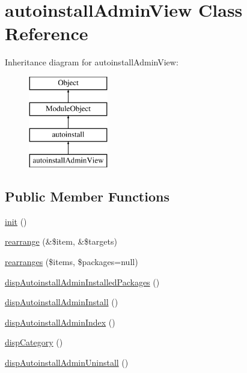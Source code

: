 \hypertarget{classautoinstallAdminView}{}\section{autoinstall\+Admin\+View Class Reference}
\label{classautoinstallAdminView}
Inheritance diagram for autoinstall\+Admin\+View\+:\begin{figure}[H]
\begin{center}
\leavevmode
\includegraphics[height=4.000000cm]{classautoinstallAdminView}
\end{center}
\end{figure}
\subsection*{Public Member Functions}
\begin{DoxyCompactItemize}
\item 
\hyperlink{classautoinstallAdminView_a206401d0dc48b6d0e60f1520ba972526}{init} ()
\item 
\hyperlink{classautoinstallAdminView_a55e52a58461106215866abf53264edb5}{rearrange} (\&\$item, \&\$targets)
\item 
\hyperlink{classautoinstallAdminView_a16c6adf0c6d6f8bb24851dd5b68416f5}{rearranges} (\$items, \$packages=null)
\item 
\hyperlink{classautoinstallAdminView_a57de04bc93c4b62ad0c8fff257b4a837}{disp\+Autoinstall\+Admin\+Installed\+Packages} ()
\item 
\hyperlink{classautoinstallAdminView_a096fdb7d03bea9f0b1a48dd5f471bbd2}{disp\+Autoinstall\+Admin\+Install} ()
\item 
\hyperlink{classautoinstallAdminView_af3c3bcabc77b8e0d812db60bfc8bc621}{disp\+Autoinstall\+Admin\+Index} ()
\item 
\hyperlink{classautoinstallAdminView_ac3b285aaf0eb96bbfb2986917ca3571b}{disp\+Category} ()
\item 
\hyperlink{classautoinstallAdminView_a5f7303fa7b93ab464b65e0917b8d75ca}{disp\+Autoinstall\+Admin\+Uninstall} ()
\end{DoxyCompactItemize}

